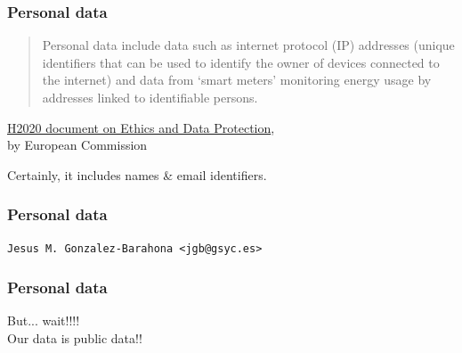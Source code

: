 \documentclass[17pt,aspectratio=169,hyperref={pdfusetitle,colorlinks,allcolors=olive}]{beamer}
\begin{document}
\begin{frame}[fragile]
  \frametitle{Personal data}

  {\footnotesize
    \begin{quotation}
      Personal  data  include  data  such  as  internet  protocol  (IP)  addresses  (unique  identifiers  that  can  be  used  to identify  the  owner  of devices connected to the internet) and data from ‘smart meters’ monitoring energy usage by addresses linked to identifiable persons.
  \end{quotation}
  }

    {\footnotesize
    \begin{flushright}
    \href{https://ec.europa.eu/research/participants/data/ref/h2020/grants_manual/hi/ethics/h2020_hi_ethics-data-protection_en.pdf}{H2020 document on Ethics and Data Protection}, \\ by European Commission
  \end{flushright}
    }

    Certainly, it includes names \& email identifiers.
    
\end{frame}

\begin{frame}[fragile]
  \frametitle{Personal data}
  
\begin{verbatim}
Jesus M. Gonzalez-Barahona <jgb@gsyc.es>
\end{verbatim}
  
\end{frame}

\begin{frame}[fragile]
  \frametitle{Personal data}

  {\Large
    But... wait!!!! \\
    \vspace{1cm}
    Our data is public data!! \\
  }
\end{frame}
\end{document}
